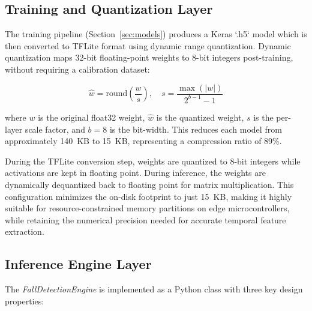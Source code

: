 \documentclass[journal]{IEEEtran}
\begin{document}
\subsection{Training and Quantization Layer}

The training pipeline (Section~\ref{sec:models}) produces a Keras `.h5` model
which is then converted to TFLite format using dynamic range quantization.
Dynamic quantization maps 32-bit floating-point weights to 8-bit integers
post-training, without requiring a calibration dataset:

\begin{equation}
  \hat{w} = \text{round}\!\left(\frac{w}{s}\right), \quad
  s = \frac{\max(|w|)}{2^{b-1} - 1}
  \label{eq:quantization}
\end{equation}

where $w$ is the original float32 weight, $\hat{w}$ is the quantized weight,
$s$ is the per-layer scale factor, and $b = 8$ is the bit-width. This reduces
each model from approximately 140~KB to 15~KB, representing a compression ratio of 89\%.

During the TFLite conversion step, weights are quantized to 8-bit integers while activations are kept in floating point. During inference, the weights are dynamically dequantized back to floating point for matrix multiplication. This configuration minimizes the on-disk footprint to just 15~KB, making it highly suitable for resource-constrained memory partitions on edge microcontrollers, while retaining the numerical precision needed for accurate temporal feature extraction.

\subsection{Inference Engine Layer}

The \textit{FallDetectionEngine} is implemented as a Python class with three
key design properties:
\end{document}
